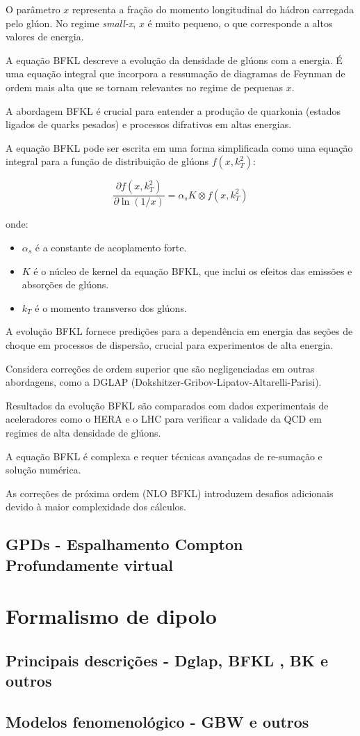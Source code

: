 O parâmetro \(x\) representa a fração do momento longitudinal do hádron carregada pelo glúon. No regime \textit{small-x}, \(x\) é muito pequeno, o que corresponde a altos valores de energia.

A equação BFKL descreve a evolução da densidade de glúons com a energia. É uma equação integral que incorpora a ressumação de diagramas de Feynman de ordem mais alta que se tornam relevantes no regime de pequenas \(x\).

A abordagem BFKL é crucial para entender a produção de quarkonia (estados ligados de quarks pesados) e processos difrativos em altas energias.

A equação BFKL pode ser escrita em uma forma simplificada como uma equação integral para a função de distribuição de glúons \( f(x, k_T^2) \):

\[
\frac{\partial f(x, k_T^2)}{\partial \ln(1/x)} = \alpha_s K \otimes f(x, k_T^2)
\]

onde:
\begin{itemize}
    \item \(\alpha_s\) é a constante de acoplamento forte.
    \item \(K\) é o núcleo de kernel da equação BFKL, que inclui os efeitos das emissões e absorções de glúons.
    \item \(k_T\) é o momento transverso dos glúons.
\end{itemize}

A evolução BFKL fornece predições para a dependência em energia das seções de choque em processos de dispersão, crucial para experimentos de alta energia.

Considera correções de ordem superior que são negligenciadas em outras abordagens, como a DGLAP (Dokshitzer-Gribov-Lipatov-Altarelli-Parisi).


Resultados da evolução BFKL são comparados com dados experimentais de aceleradores como o HERA e o LHC para verificar a validade da QCD em regimes de alta densidade de glúons.

A equação BFKL é complexa e requer técnicas avançadas de re-sumação e solução numérica.


As correções de próxima ordem (NLO BFKL) introduzem desafios adicionais devido à maior complexidade dos cálculos.



\subsection{GPDs -  Espalhamento Compton Profundamente virtual}
 \section{Formalismo de dipolo}
\subsection{Principais descrições - Dglap, BFKL , BK e outros}
\subsection{Modelos fenomenológico - GBW e outros}


